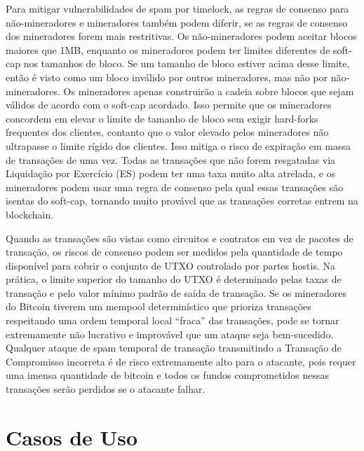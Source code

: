 \documentclass[letterpaper,11pt]{article}
\begin{document}
Para mitigar vulnerabilidades de spam por timelock, as regras de consenso
para não-mineradores e mineradores também podem diferir, se as regras de
consenso dos mineradores forem mais restritivas. Os não-mineradores podem
aceitar blocos maiores que 1MB, enquanto os mineradores podem ter limites
diferentes de soft-cap nos tamanhos de bloco. Se um tamanho de bloco
estiver acima desse limite, então é visto como um bloco inválido por outros
mineradores, mas não por não-mineradores. Os mineradores apenas construirão
a cadeia sobre blocos que sejam válidos de acordo com o soft-cap acordado.
Isso permite que os mineradores concordem em elevar o limite de tamanho de
bloco sem exigir hard-forks frequentes dos clientes, contanto que o valor
elevado pelos mineradores não ultrapasse o limite rígido dos clientes. Isso
mitiga o risco de expiração em massa de transações de uma vez. Todas as
transações que não forem resgatadas via Liquidação por Exercício (ES) podem
ter uma taxa muito alta atrelada, e os mineradores podem usar uma regra de
consenso pela qual essas transações são isentas do soft-cap, tornando muito
provável que as transações corretas entrem na blockchain.

Quando as transações são vistas como circuitos e contratos em vez de
pacotes de transação, os riscos de consenso podem ser medidos pela
quantidade de tempo disponível para cobrir o conjunto de UTXO controlado
por partes hostis. Na prática, o limite superior do tamanho do UTXO é
determinado pelas taxas de transação e pelo valor mínimo padrão de saída
de transação. Se os mineradores do Bitcoin tiverem um mempool
determinístico que prioriza transações respeitando uma ordem temporal
local ``fraca'' das transações, pode se tornar extremamente não lucrativo e
improvável que um ataque seja bem-sucedido. Qualquer ataque de spam
temporal de transação transmitindo a Transação de Compromisso incorreta é
de risco extremamente alto para o atacante, pois requer uma imensa
quantidade de bitcoin e todos os fundos comprometidos nessas transações
serão perdidos se o atacante falhar.

\section{Casos de Uso}
\end{document}
